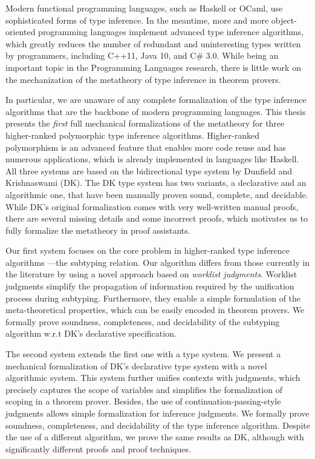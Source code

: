%
\noindent

Modern functional programming languages, such as Haskell or OCaml,
use sophisticated forms of type inference.
In the meantime, more and more object-oriented programming languages
implement advanced type inference algorithms,
which greatly reduces the number of redundant and uninteresting types
written by programmers,
including C++11, Java 10, and C\# 3.0.
While being an important topic in the Programming Languages research,
there is little work on the mechanization of
the metatheory of type inference in theorem provers.

In particular, we are unaware of any complete formalization of
the type inference algorithms that are the backbone of modern programming languages.
This thesis presents the \emph{first} full mechanical formalizations
of the metatheory for three higher-ranked polymorphic type inference algorithms.
Higher-ranked polymorphism is an advanced feature that enables more code reuse
and has numerous applications, which is already implemented in languages like Haskell.
All three systems are based on the bidirectional type system
by Dunfield and Krishnaswami (DK).
The DK type system has two variants, a declarative and an algorithmic one,
that have been manually proven sound, complete, and decidable.
While DK's original formalization comes with very well-written manual proofs,
there are several missing details and some incorrect proofs,
which motivates us to fully formalize the metatheory in proof assistants.

Our first system focuses on the core problem in higher-ranked type inference algorithms
---the subtyping relation.
Our algorithm differs from those currently in the literature
by using a novel approach based on \emph{worklist judgments}.
Worklist judgments simplify the propagation of information
required by the unification process during subtyping.
Furthermore, they enable a simple formulation of the meta-theoretical
properties, which can be easily encoded in theorem provers.
We formally prove soundness, completeness, and decidability of the subtyping algorithm
w.r.t DK's declarative specification.

The second system extends the first one with a type system.
We present a mechanical formalization of
DK's declarative type system with a novel algorithmic system.
This system further unifies contexts with judgments,
which precisely captures the scope of variables and
simplifies the formalization of scoping in a theorem prover.
Besides, the use of continuation-passing-style judgments allows
simple formalization for inference judgments.
We formally prove soundness, completeness, and decidability of the type inference algorithm.
Despite the use of a different algorithm, we prove the same results as DK,
although with significantly different proofs and proof techniques.


